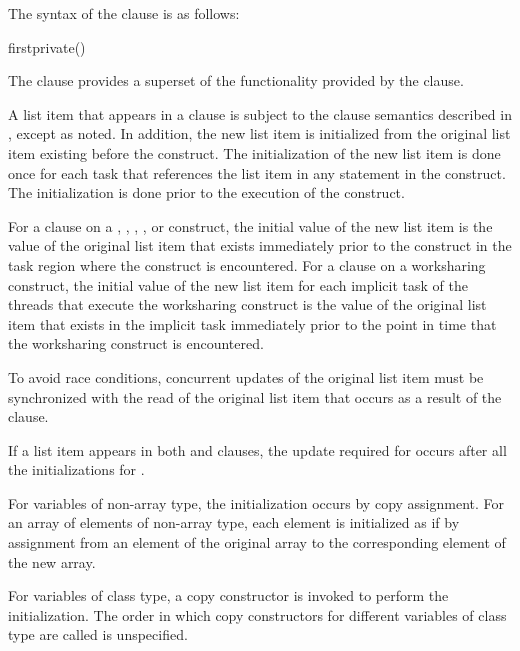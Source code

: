 {{{{\syntax
The syntax of the  clause is as follows:

\begin{boxedcode}
firstprivate()
\end{boxedcode}

\descr
The  clause provides a superset of the functionality provided by the 
 clause. 

A list item that appears in a  clause is subject to the  clause 
semantics described in 
, 
except as noted. In addition, the 
new list item is initialized from the original list item existing before the construct. The 
initialization of the new list item is done once for each task that references the list item 
in any statement in the construct. The initialization is done prior to the execution of the 
construct.

For a  clause on a , ,
, , or  construct, the
initial value of the new list item is the value of the original list
item that exists immediately prior to the construct in the task region
where the construct is encountered. For a  clause
on a worksharing construct, the initial value of the new list item for
each implicit task of the threads that execute the worksharing
construct is the value of the original list item that exists in the
implicit task immediately prior to the point in time that the
worksharing construct is encountered.

To avoid race conditions, concurrent updates of the original list item must be 
synchronized with the read of the original list item that occurs as a result of the 
 clause.

If a list item appears in both  and  clauses, the update 
required for  occurs after all the initializations for .

\ccppspecificstart
For variables of non-array type, the initialization occurs by copy assignment. For an 
array of elements of non-array type, each element is initialized as if by assignment from 
an element of the original array to the corresponding element of the new array. 
\ccppspecificend

\cppspecificstart
For variables of class type, a copy constructor is invoked to perform the initialization. 
The order in which copy constructors for different variables of class type are called is 
unspecified. 
\cppspecificend

}}}}
